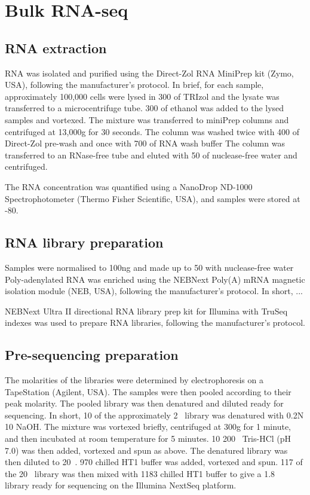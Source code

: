\section{Bulk RNA-seq}\label{sec:bulk_lib_prep}
\subsection{RNA extraction}\label{subsec:rna_extraction}
RNA was isolated and purified using the Direct-Zol RNA MiniPrep kit (Zymo, USA), following the manufacturer's protocol.
In brief, for each sample, approximately 100,000 cells were lysed in 300\ul{} of TRIzol and the lysate was transferred to a microcentrifuge tube.
300\ul{} of ethanol was added to the lysed samples and vortexed.
The mixture was transferred to miniPrep columns and centrifuged at 13,000g for 30 seconds.
The column was washed twice with 400\ul{} of Direct-Zol pre-wash and once with 700\ul{} of RNA wash buffer
The column was transferred to an RNase-free tube and eluted with 50\ul{} of nuclease-free water and centrifuged.

The RNA concentration was quantified using a NanoDrop ND-1000 Spectrophotometer (Thermo Fisher Scientific, USA), and samples were stored at -80\C{}.

\subsection{RNA library preparation}
Samples were normalised to 100\si{\ng} and made up to 50\ul{} with nuclease-free water
Poly-adenylated RNA was enriched using the NEBNext Poly(A) mRNA magnetic isolation module (NEB, USA), following the manufacturer's protocol.
In short, ...


NEBNext\textsuperscript{\textregistered} Ultra II directional RNA library prep kit for Illumina\textsuperscript{\textregistered} with TruSeq indexes was used to prepare RNA libraries, following the manufacturer's protocol.



\subsection{Pre-sequencing preparation}\label{subsec:preseq}
The molarities of the libraries were determined by electrophoresis on a TapeStation (Agilent, USA).
The samples were then pooled according to their peak molarity.
The pooled library was then denatured and diluted ready for sequencing.
In short, 10\ul{} of the approximately 2\si{\nano\Molar} library was denatured with 0.2N 10\ul{} NaOH.
The mixture was vortexed briefly, centrifuged at 300g for 1 minute, and then incubated at room temperature for 5 minutes.
10\ul{} 200\si{\milli\Molar} Tris-HCl (pH 7.0) was then added, vortexed and spun as above.
The denatured library was then diluted to 20\si{\pico\Molar}.
970\ul{} chilled HT1 buffer was added, vortexed and spun.
117\ul{} of the 20\si{\pico\Molar} library was then mixed with 1183\ul{} chilled HT1 buffer to give a 1.8\si{\pico\Molar} library ready for sequencing on the Illumina NextSeq platform.

